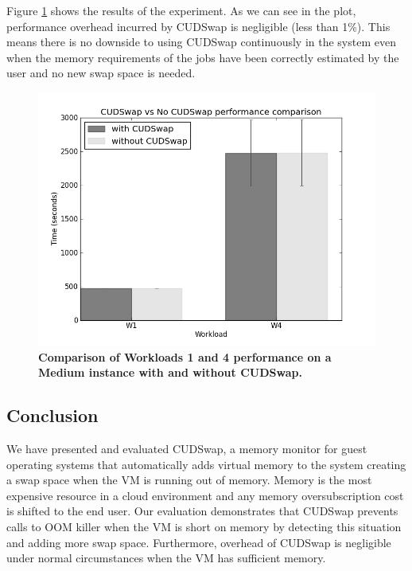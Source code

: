 Figure \ref{cudswapfigure4} shows the results of the
experiment. As we can see in the plot, performance overhead incurred
by CUDSwap is negligible (less than 1\%). This means there is no downside
to using CUDSwap continuously in the system even when the memory
requirements of the jobs have been correctly estimated by the user
and no new swap space is needed.

\begin{figure}[htbp]
\includegraphics[width=\columnwidth]{chapter_cudswap_figures/with_vs_without.jpg}
\caption[Comparison of Workloads 1 and 4 performance on a Medium instance with and without CUDSwap]{\textbf{Comparison of Workloads 1 and 4 performance on a Medium instance with and without CUDSwap.}}
\label{cudswapfigure4}
\end{figure}

\subsection{Conclusion}\label{sub_cudswap_Conclusion}

We have presented and evaluated CUDSwap, a memory
monitor for guest operating systems that automatically adds virtual memory
to the system creating a swap space when the VM is running out of memory.
Memory is the most expensive resource in a cloud environment and
any memory oversubscription cost is shifted to the end user. Our evaluation
demonstrates that CUDSwap prevents calls to OOM killer when the VM is
short on memory by detecting this situation and adding more swap
space. Furthermore, overhead of CUDSwap is negligible under normal
circumstances when the VM has sufficient memory.

